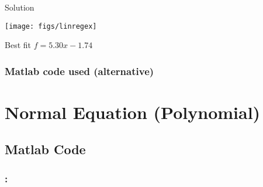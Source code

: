\documentclass[xcolor=dvipsnames,11pt]{beamer}
\begin{document}
\begin{frame}{Solution}
\begin{center}
\texttt{[image: figs/linregex]}

Best fit  $f = 5.30 x - 1.74$
\end{center}
\end{frame}

\subsubsection{Matlab code used (alternative)}

\begin{frame}	
\frametitle{\subsubsecname}

\vspace{-3pt}	
	
\end{frame}

\section{Normal Equation (Polynomial)}

\subsection{Matlab Code}

\begin{frame}	
\frametitle{\secname: \subsecname}
\vspace{-7pt}
\vspace{-7pt}	


\end{frame}


\end{document}
